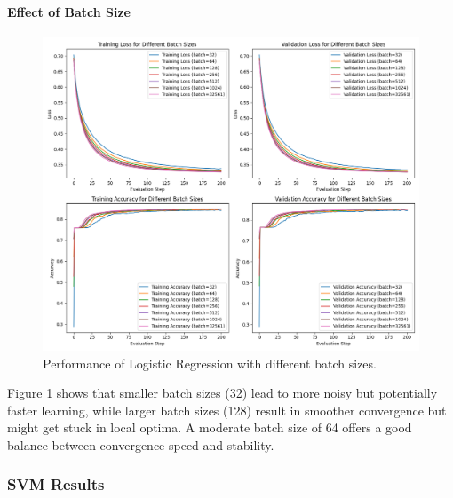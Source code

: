 \documentclass[journal, a4paper]{IEEEtran}
\begin{document}
\paragraph{Effect of Batch Size}
\begin{figure}[H]
\centering
\includegraphics[width=\linewidth]{logistic_regression_batch_sizes.png}
\caption{Performance of Logistic Regression with different batch sizes.}
\label{fig:lr_batch}
\end{figure}

Figure \ref{fig:lr_batch} shows that smaller batch sizes (32) lead to more noisy but potentially faster learning, while larger batch sizes (128) result in smoother convergence but might get stuck in local optima. A moderate batch size of 64 offers a good balance between convergence speed and stability.

\subsubsection{SVM Results}
\end{document}
